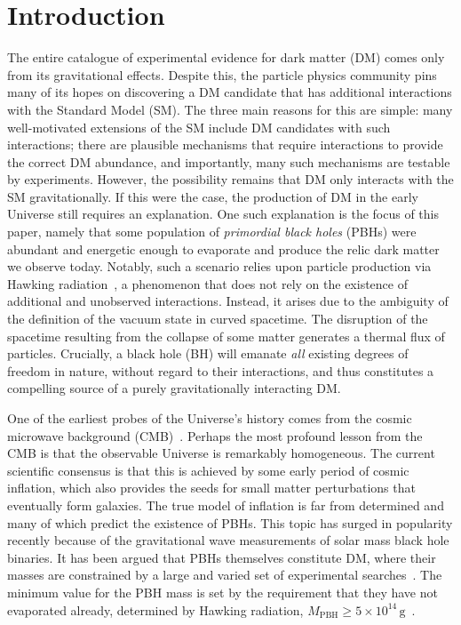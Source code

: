 \documentclass[aps,prd,reprint,twocolumn,preprintnumbers,floatfix,nofootinbib]{revtex4-1}
\begin{document}
\maketitle

\section{Introduction}

The entire catalogue of experimental evidence for dark matter (DM) comes only from its gravitational effects. Despite this, the particle physics community pins many of its hopes on discovering a DM candidate that has additional interactions with the Standard Model (SM). The three main reasons for this are simple: many well-motivated extensions of the SM include DM candidates with such interactions; there are plausible mechanisms that require interactions to provide the correct DM abundance, and importantly, many such mechanisms are testable by experiments. However, the possibility remains that DM only interacts with the SM gravitationally. If this were the case, the production of DM in the early Universe still requires an explanation. One such explanation is the focus of this paper, namely  that some population of {\em primordial black holes} (PBHs) were abundant and energetic enough to evaporate and produce the relic dark matter we observe today. Notably, such a scenario relies upon particle production via Hawking radiation~\cite{Hawking:1974rv,Hawking:1974sw}, a phenomenon that does not rely on the existence of additional and unobserved interactions. Instead, it arises due to the ambiguity of the definition of the vacuum state in curved spacetime. The disruption of the spacetime resulting from the collapse of some matter generates a thermal flux of particles. Crucially, a black hole (BH) will emanate \emph{all} existing degrees of freedom in nature, without regard to their interactions, and thus constitutes a compelling source of a purely gravitationally interacting DM.

One of the earliest probes of the Universe's history comes from the cosmic microwave background (CMB)~\cite{Ade:2015lrj,Ade:2015xua}. Perhaps the most profound lesson from the CMB is that the observable Universe is remarkably homogeneous. The current scientific consensus is that this is achieved by some early period of cosmic inflation, which also provides the seeds for small matter perturbations that eventually form galaxies. The true model of inflation is far from determined and many of which predict the existence of PBHs. This topic has surged in popularity recently because of the gravitational wave measurements of solar mass black hole binaries. It has been argued that PBHs themselves constitute DM, where their masses are constrained by a large and varied set of experimental searches~\cite{Carr:2016drx,Green:2020jor}. The minimum value for the PBH mass is set by the requirement that they have not evaporated already, determined by Hawking radiation, $M_{\textrm{PBH}}\geq 5\times 10^{14}\,\textrm{g}$~\cite{Carr:2020gox}. 
\end{document}
